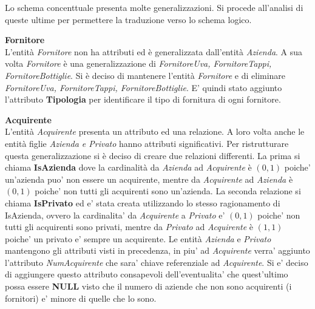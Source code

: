 Lo schema concenttuale presenta molte generalizzazioni. Si procede all'analisi di queste ultime per permettere la traduzione verso lo schema logico.\\

\begin{flushleft}
	\textbf{\large{Fornitore}}\\
	L'entità \emph{Fornitore} non ha attributi ed è generalizzata dall'entità \emph{Azienda}. A sua volta \emph{Fornitore} è una generalizzazione di \emph{FornitoreUva, FornitoreTappi, FornitoreBottiglie}. Si è deciso di mantenere l'entità \emph{Fornitore} e di eliminare \emph{FornitoreUva, FornitoreTappi, FornitoreBottiglie}. E' quindi stato aggiunto l'attributo \textbf{Tipologia} per identificare il tipo di fornitura di ogni fornitore.
\end{flushleft}


\begin{flushleft}
	\textbf{\large{Acquirente}}\\
	L'entità \emph{Acquirente} presenta un attributo ed una relazione. A loro volta anche le entità figlie \emph{Azienda e Privato} hanno attributi significativi. Per ristrutturare questa generalizzazione si è deciso di creare due relazioni differenti. La prima si chiama \textbf{IsAzienda} dove la cardinalità da \emph{Azienda} ad \emph{Acquirente} è $(0,1)$ poiche' un'azienda puo' non essere un acquirente, mentre da \emph{Acquirente} ad \emph{Azienda} è $(0,1)$ poiche' non tutti gli acquirenti sono un'azienda.
	La seconda relazione si chiama \textbf{IsPrivato} ed e' stata creata utilizzando lo stesso ragionamento di IsAzienda, ovvero la cardinalita' da \emph{Acquirente} a \emph{Privato} e' $(0,1)$ poiche' non tutti gli acquirenti sono privati, mentre da \emph{Privato} ad \emph{Acquirente} è $(1,1)$ poiche' un privato e' sempre un acquirente. Le entità \emph{Azienda} e \emph{Privato} mantengono gli attributi visti in precedenza, in piu' ad \emph{Acquirente} verra' aggiunto l'attributo \emph{NumAcquirente} che sara' chiave referenziale ad \emph{Acquirente}. Si e' deciso di aggiungere questo attributo consapevoli dell'eventualita' che quest'ultimo possa essere \textbf{NULL} visto che il numero di aziende che non sono acquirenti (i fornitori) e' minore di quelle che lo sono.
\end{flushleft}

